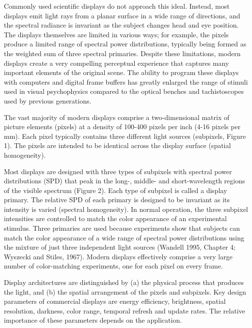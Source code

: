 \documentclass[
  letterpaper,
]{book}
\begin{document}
Commonly used scientific displays do not approach this ideal. Instead,
most displays emit light rays from a planar surface in a wide range of
directions, and the spectral radiance is invariant as the subject
changes head and eye position. The displays themselves are limited in
various ways; for example, the pixels produce a limited range of
spectral power distributions, typically being formed as the weighted sum
of three spectral primaries. Despite these limitations, modern displays
create a very compelling perceptual experience that captures many
important elements of the original scene. The ability to program these
displays with computers and digital frame buffers has greatly enlarged
the range of stimuli used in visual psychophysics compared to the
optical benches and tachistoscopes used by previous generations.

The vast majority of modern displays comprise a two-dimensional matrix
of picture elements (pixels) at a density of 100-400 pixels per inch
(4-16 pixels per mm). Each pixel typically contains three different
light sources (subpixels, Figure 1). The pixels are intended to be
identical across the display surface (spatial homogeneity).

Most displays are designed with three types of subpixels with spectral
power distributions (SPD) that peak in the long-, middle- and
short-wavelength regions of the visible spectrum (Figure 2). Each type
of subpixel is called a display primary. The relative SPD of each
primary is designed to be invariant as its intensity is varied (spectral
homogeneity). In normal operation, the three subpixel intensities are
controlled to match the color appearance of an experimental stimulus.
Three primaries are used because experiments show that subjects can
match the color appearance of a wide range of spectral power
distributions using the mixture of just three independent light sources
(Wandell 1995, Chapter 4; Wyszecki and Stiles, 1967). Modern displays
effectively comprise a very large number of color-matching experiments,
one for each pixel on every frame.

Display architectures are distinguished by (a) the physical process that
produces the light, and (b) the spatial arrangement of the pixels and
subpixels. Key design parameters of commercial displays are energy
efficiency, brightness, spatial resolution, darkness, color range,
temporal refresh and update rates. The relative importance of these
parameters depends on the application.
\end{document}
